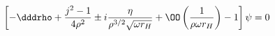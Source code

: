 \begin{equation} \label{wave-equation-rho}
\left[ -\dddrho + \frac{j^2-1}{4 \rho^2} \pm i \frac{\eta}{\rho^{3/2}\sqrt{\omega r_H}} + \OO\left(\frac{1}{\rho \omega r_H}\right) - 1 \right] \psi = 0
\end{equation}

